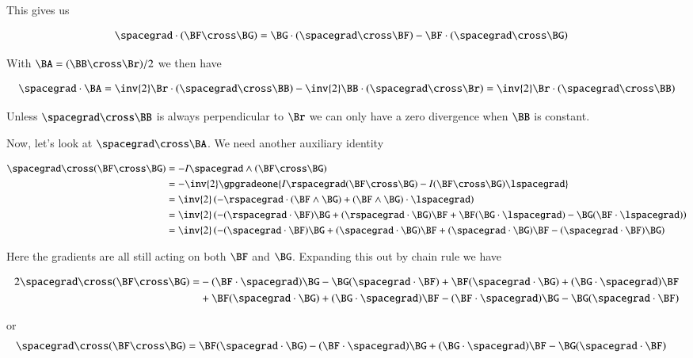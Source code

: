 This gives us

\begin{align}\label{eqn:desaiCh6:2}
\spacegrad \cdot (\BF \cross \BG)
&=
\BG \cdot (\spacegrad \cross \BF)  - \BF \cdot (\spacegrad \cross \BG)
\end{align}

With $\BA = (\BB \cross \Br)/2$ we then have

\begin{align}\label{eqn:desaiCh6:3}
\spacegrad \cdot \BA =
\inv{2} \Br \cdot (\spacegrad \cross \BB)  - \inv{2} \BB \cdot (\spacegrad \cross \Br)
=
\inv{2} \Br \cdot (\spacegrad \cross \BB)
\end{align}

Unless $\spacegrad \cross \BB$ is always perpendicular to $\Br$ we can only have a zero divergence when $\BB$ is constant.

Now, let's look at $\spacegrad \cross \BA$.  We need another auxiliary identity

\begin{align*}
\spacegrad \cross (\BF \cross \BG)
&=
-I \spacegrad \wedge (\BF \cross \BG) \\
&=
-\inv{2} \gpgradeone{
I \rspacegrad (\BF \cross \BG)
- I (\BF \cross \BG) \lspacegrad
} \\
&=
\inv{2} \left(
-\rspacegrad \cdot (\BF \wedge \BG)
+ (\BF \wedge \BG) \cdot \lspacegrad
\right) \\
&=
\inv{2} \left(
-(\rspacegrad \cdot \BF) \BG
+(\rspacegrad \cdot \BG) \BF
+ \BF (\BG \cdot \lspacegrad )
- \BG (\BF \cdot \lspacegrad )
\right)
\\
&=
\inv{2} \left(
-(\spacegrad \cdot \BF) \BG
+(\spacegrad \cdot \BG) \BF
+ (\spacegrad \cdot \BG ) \BF
- (\spacegrad \cdot \BF ) \BG
\right)
\end{align*}

Here the gradients are all still acting on both $\BF$ and $\BG$.  Expanding this out by chain rule we have

\begin{align*}
2 \spacegrad \cross (\BF \cross \BG)
=
&-(\BF \cdot \spacegrad) \BG
-\BG (\spacegrad \cdot \BF)   
+\BF (\spacegrad \cdot \BG)
+(\BG \cdot \spacegrad ) \BF  \\
\quad&+\BF (\spacegrad \cdot \BG )
+ (\BG \cdot \spacegrad ) \BF  
- (\BF \cdot \spacegrad ) \BG
- \BG (\spacegrad \cdot \BF )
\end{align*}

or
\begin{align}\label{eqn:desaiCh6:4}
\spacegrad \cross (\BF \cross \BG)
&=
\BF (\spacegrad \cdot \BG) -(\BF \cdot \spacegrad) \BG
+(\BG \cdot \spacegrad ) \BF  -\BG (\spacegrad \cdot \BF)
\end{align}

